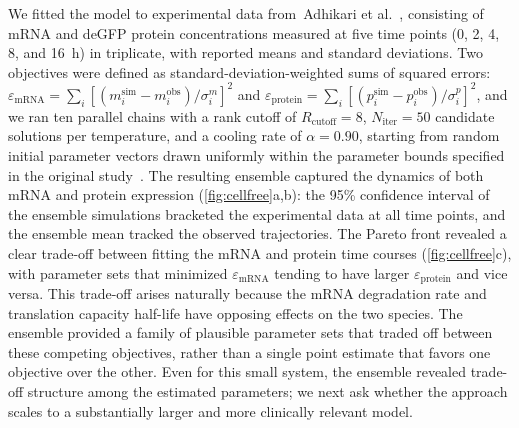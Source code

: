\documentclass[preprint,review,12pt]{elsarticle}
\begin{document}
We fitted the model to experimental data from~Adhikari et al.~\cite{Adhikari2020}, consisting of mRNA and deGFP protein concentrations measured at five time points (0, 2, 4, 8, and 16~h) in triplicate, with reported means and standard deviations. Two objectives were defined as standard-deviation-weighted sums of squared errors: $\varepsilon_{\text{mRNA}} = \sum_i [(m_i^{\text{sim}} - m_i^{\text{obs}}) / \sigma_i^m]^2$ and $\varepsilon_{\text{protein}} = \sum_i [(p_i^{\text{sim}} - p_i^{\text{obs}}) / \sigma_i^p]^2$, and we ran ten parallel chains with a rank cutoff of $R_{\text{cutoff}} = 8$, $N_{\text{iter}} = 50$ candidate solutions per temperature, and a cooling rate of $\alpha = 0.90$, starting from random initial parameter vectors drawn uniformly within the parameter bounds specified in the original study~\cite{Adhikari2020}. The resulting ensemble captured the dynamics of both mRNA and protein expression (\cref{fig:cellfree}a,b): the 95\% confidence interval of the ensemble simulations bracketed the experimental data at all time points, and the ensemble mean tracked the observed trajectories. The Pareto front revealed a clear trade-off between fitting the mRNA and protein time courses (\cref{fig:cellfree}c), with parameter sets that minimized $\varepsilon_{\text{mRNA}}$ tending to have larger $\varepsilon_{\text{protein}}$ and vice versa. This trade-off arises naturally because the mRNA degradation rate and translation capacity half-life have opposing effects on the two species. The ensemble provided a family of plausible parameter sets that traded off between these competing objectives, rather than a single point estimate that favors one objective over the other. Even for this small system, the ensemble revealed trade-off structure among the estimated parameters; we next ask whether the approach scales to a substantially larger and more clinically relevant model.
\end{document}
